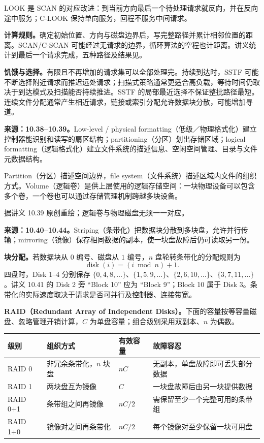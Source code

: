 LOOK 是 SCAN 的对应改进：到当前方向最后一个待处理请求就反向，并在反向途中服务；C-LOOK 保持单向服务，回程不服务中间请求。

\textbf{计算规则。}确定初始位置、方向与磁盘边界后，写完整路径并累计相邻位置的距离。SCAN/C-SCAN 可能经过无请求的边界，循环算法的空程也计距离。讲义统计到最后一个请求完成，五种路径及结果见。

\textbf{饥饿与选择。}有限且不再增加的请求集可以全部处理完。持续到达时，SSTF 可能不断选择附近请求而推迟远处请求；扫描式策略通常更适合高负载，等待时间仍取决于到达模式及扫描能否持续推进。SSTF 的局部最近选择不保证整批路径最短。连续文件分配通常产生相近请求，链接或索引分配允许数据块分散，可能增加寻道。


\textbf{来源：10.38--10.39。}Low-level / physical formatting（低级／物理格式化）建立控制器能识别和读写的扇区结构；partitioning（分区）划出存储区域；logical formatting（逻辑格式化）建立文件系统的描述信息、空闲空间管理、目录与文件元数据结构。

Partition（分区）描述空间边界，file system（文件系统）描述区域内文件的组织方式。Volume（逻辑卷）是供上层使用的逻辑存储空间：一块物理设备可以包含多个卷，一个卷也可以通过存储管理机制跨越多块设备。
\begin{center}


{\small 据讲义 10.39 原创重绘；逻辑卷与物理磁盘无须一一对应。}
\end{center}


\textbf{来源：10.40--10.44。}Striping（条带化）把数据块分散到多块盘，允许并行传输；mirroring（镜像）保存相同数据的副本，使一块盘故障后仍可读取另一份。

\textbf{块分配。}若数据块从 $0$ 编号、磁盘从 $1$ 编号，$n$ 盘轮转条带化的分配规则为
\[
  \boxed{\operatorname{disk}(i)=(i\bmod n)+1}.
\]
四盘时，Disk 1--4 分别保存 $\{0,4,8,\ldots\}$、$\{1,5,9,\ldots\}$、$\{2,6,10,\ldots\}$、$\{3,7,11,\ldots\}$。讲义 10.41 的 Disk 2 旁 ``Block 10'' 应为 ``Block 9''；Block 10 属于 Disk 3。条带化的实际速度取决于请求是否可并行及控制器、连接带宽。

\textbf{RAID（Redundant Array of Independent Disks）。}下面的容量按等容量磁盘、忽略管理开销计算，$C$ 为单盘容量；组合级别采用双副本、$n$ 为偶数。
\begin{center}
\small
\begin{tabularx}{\textwidth}{@{}lp{3.35cm}lX@{}}
\toprule
级别 & 组织方式 & 有效容量 & 故障容忍 \\
\midrule
RAID 0 & 非冗余条带化，$n$ 块盘 & $nC$ & 无副本，单盘故障即可丢失部分数据 \\
RAID 1 & 两块盘互为镜像 & $C$ & 一块盘故障后由另一块提供数据 \\
RAID 0+1 & 条带组之间再镜像 & $nC/2$ & 需保留至少一个完整可用的条带组 \\
RAID 1+0 & 镜像对之间再条带化 & $nC/2$ & 每个镜像对至少保留一块可用盘 \\
\bottomrule
\end{tabularx}
\end{center}

